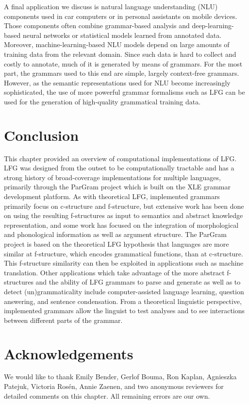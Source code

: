 \documentclass[output=paper,hidelinks]{langscibook}
\begin{document}
A final application we discuss is
natural language understanding (NLU) components  used in   car computers or in personal assistants on mobile devices. Those
components often combine grammar-based analysis and deep-learn\-ing-based neural networks or statistical models learned from annotated data. Moreover, machine-learning-based
NLU models depend on large amounts of training data from the relevant domain. Since such data is hard to collect and costly to annotate, much of it is generated by means of grammars. For the most part, the grammars used to this end are simple, largely context-free grammars. However, as the semantic representations used for NLU become increasingly sophisticated, the use of more powerful grammar formalisms such as LFG can be used for the generation of high-quality grammatical training data. 


        

%

\section{Conclusion}
This chapter provided an overview of computational implementations of LFG. LFG was designed from the outset to be computationally tractable and has a strong history of broad-coverage implementations for multiple languages, primarily through the ParGram project  which is built on the XLE grammar development platform. As with theoretical LFG, implemented grammars primarily focus on c-structure and f-structure, but extensive work has been done on using the resulting f-structures as input to semantics and abstract knowledge representation, and some work has focused on the integration of morphological and phonological information as well as argument structure. The ParGram project is based on the theoretical LFG hypothesis that languages are more similar at f-structure, which encodes grammatical functions, than at c-structure. This f-structure similarity can then be exploited in applications such as machine translation. Other applications which take advantage of the more abstract f-structures and the ability of LFG grammars to parse and generate as well as to detect (un)grammaticality include computer-assisted language learning, question answering, and sentence condensation. From a theoretical linguistic perspective, implemented grammars allow the linguist to test analyses and to see interactions between different parts of the grammar.


\section{Acknowledgements}

We would like to thank Emily Bender, Gerlof Bouma, Ron Kaplan, Agnieszka Patejuk, Victoria Ros\'en, Annie Zaenen, and two anonymous reviewers for detailed comments on this chapter. All remaining errors are our own.

\sloppy
\printbibliography[heading=subbibliography,notkeyword=this]
\end{document}
